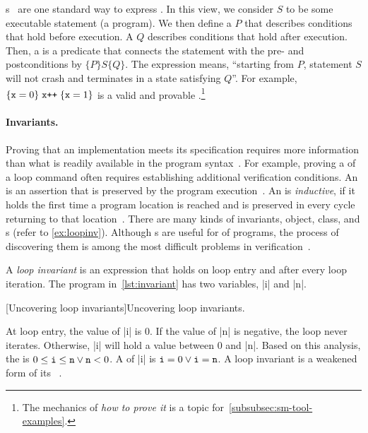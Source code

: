 s~\cite{hoare1969} are one standard way to express
. In this view, we consider \(S\) to be some executable
statement (a program). We then define a \emph{}
\(P\) that describes conditions that hold before execution. A
\emph{} \(Q\) describes conditions that hold
after execution. Then, a \emph{} is a predicate that connects
the statement with the pre- and postconditions by \(\{P\} S
\{Q\}\). The expression means, \enquote{starting from
\(P\), statement \(S\) will not crash and terminates in a state
satisfying \(Q\)}. For example, \(\{ \prm{x}=0
\}\;\prm{x++}\;\{\prm{x}=1\}\) is a valid and provable .\footnote{The mechanics of \emph{how to prove it} is a topic
for~\autoref{subsubsec:sm-tool-examples}.}

\paragraph*{Invariants.}
Proving that an implementation meets its specification requires more information
than what is readily available in the program syntax~\cite{chang2005}. For
example, proving a  of a loop command often requires
establishing additional verification conditions. An \emph{} is an
assertion that is preserved by the program execution~\cite{furia2014}. An
 is \emph{inductive}, if it holds the
first time a program location is reached and is preserved in every cycle
returning to that location~\cite{sankaranarayanan2004}. There are many kinds of
invariants, \eg object, class,
and s (refer to \autoref{ex:loopinv}). Although
s are useful for  of programs, the
process of discovering them is among the most difficult problems in
verification~\cite{dillig2013,yu2023}.

\begin{example}\label{ex:loopinv}
A \emph{loop invariant} is an expression that holds on loop entry and after
every loop iteration. The program in~\autoref{lst:invariant} has two variables,
\pr|i| and \pr|n|.

\begin{center}
\begin{minipage}{\textwidth}
\captionsetup{type=lstlisting}
[Uncovering loop invariants]{Uncovering loop invariants.}
\label{lst:invariant}
\end{minipage}
\end{center}

At loop entry, the value of \pr|i| is 0. If the value of \pr|n| is negative, the
loop never iterates. Otherwise, \pr|i| will hold a value between 0 and \pr|n|.
Based on this analysis, the  is \(0 \leq \prm{i} \leq
\prm{n} \vee \prm{n} < 0\). A  of \pr|i| is \(\prm{i}=0 \vee
\prm{i}=\prm{n}\). A loop invariant is a {weakened} form of its
~\cite{furia2010}.
\end{example}

